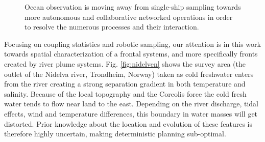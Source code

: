 \documentclass[aoas]{imsart}
\begin{document}
\begin{figure}[!h] 
  \centering 
  \hfill
  \caption{Ocean observation is moving away from single-ship sampling towards more autonomous and collaborative networked operations in order to resolve the numerous processes and their interaction.} \label{fig:envir}
\end{figure}



Focusing on coupling statistics and robotic sampling, our attention is in this work towards spatial characterization of a frontal systems, and more specifically fronts created by river plume systems. Fig. \ref{fig:nidelven} shows the survey area (the outlet of the Nidelva river, Trondheim, Norway) taken as cold freshwater enters from the river creating a strong separation gradient in both temperature and salinity. Because of the local topography and the Coreolis force \citep{coriolis1835memoire} the cold fresh water tends to flow near land to the east. Depending on the river discharge, tidal effects, wind and temperature differences, this boundary in water masses will get distorted. Prior knowledge about the location and evolution of these features is therefore highly uncertain, making deterministic planning sub-optimal.
\end{document}
